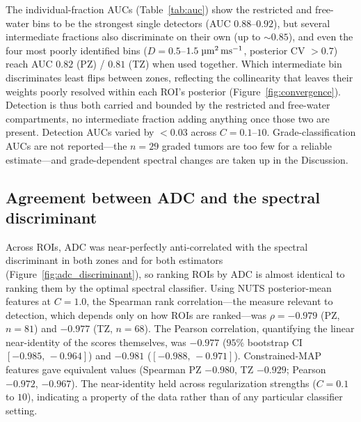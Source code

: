 The individual-fraction AUCs (Table~\ref{tab:auc}) show the restricted and free-water bins to be the strongest single detectors (AUC $0.88$--$0.92$), but several intermediate fractions also discriminate on their own (up to $\sim$$0.85$), and even the four most poorly identified bins ($D = 0.5$--$1.5\;\si{\micro\meter\squared\per\milli\second}$, posterior CV $> 0.7$) reach AUC $0.82$ (PZ) / $0.81$ (TZ) when used together. Which intermediate bin discriminates least flips between zones, reflecting the collinearity that leaves their weights poorly resolved within each ROI's posterior (Figure~\ref{fig:convergence}).
Detection is thus both carried and bounded by the restricted and free-water compartments, no intermediate fraction adding anything once those two are present.
Detection AUCs varied by $< 0.03$ across $C = 0.1$--$10$. Grade-classification AUCs are not reported---the $n = 29$ graded tumors are too few for a reliable estimate---and grade-dependent spectral changes are taken up in the Discussion.

\subsection{Agreement between ADC and the spectral discriminant}

Across ROIs, ADC was near-perfectly anti-correlated with the spectral discriminant in both zones and for both estimators (Figure~\ref{fig:adc_discriminant}), so ranking ROIs by ADC is almost identical to ranking them by the optimal spectral classifier. Using NUTS posterior-mean features at $C = 1.0$, the Spearman rank correlation---the measure relevant to detection, which depends only on how ROIs are ranked---was $\rho = -0.979$ (PZ, $n = 81$) and $-0.977$ (TZ, $n = 68$). The Pearson correlation, quantifying the linear near-identity of the scores themselves, was $-0.977$ ($95\%$ bootstrap CI $[-0.985,\,-0.964]$) and $-0.981$ ($[-0.988,\,-0.971]$). Constrained-MAP features gave equivalent values (Spearman PZ $-0.980$, TZ $-0.929$; Pearson $-0.972$, $-0.967$). The near-identity held across regularization strengths ($C = 0.1$ to $10$), indicating a property of the data rather than of any particular classifier setting.

